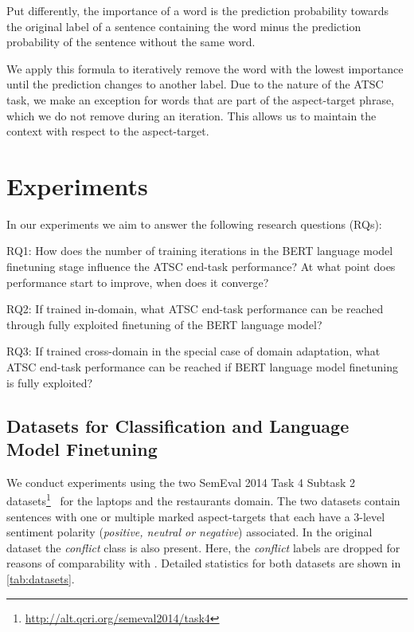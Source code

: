 \documentclass[11pt,a4paper]{article}
\newcommand{\rood}[1]{}
\begin{document}
Put differently, the importance of a word is the prediction probability towards the original label of a sentence containing the word minus the prediction probability of the sentence without the same word.

We apply this formula to iteratively remove the word with the lowest importance until the prediction changes to another label. Due to the nature of the ATSC task, we make an exception for words that are part of the aspect-target phrase, which we do not remove during an iteration. This allows us to maintain the context with respect to the aspect-target.

\section{Experiments}
In our experiments we aim to answer the following research questions (RQs):

RQ1: How does the number of training iterations in the BERT language model finetuning stage influence the ATSC end-task performance? At what point does performance start to improve, when does it converge?

RQ2: If trained in-domain, what ATSC end-task performance can be reached through fully exploited finetuning of the BERT language model?

RQ3: If trained cross-domain in the special case of domain adaptation, what ATSC end-task performance can be reached if BERT language model finetuning is fully exploited?

\subsection{Datasets for Classification and Language Model Finetuning}
\rood{Outcome: Readers understand how we make use/preprocess and so on of SemEval 2014 Datasets and the corpora for LM finetuning}

We conduct experiments using the two SemEval 2014 Task 4 Subtask 2
datasets\footnote{\url{http://alt.qcri.org/semeval2014/task4}}~\cite{Pontiki2014}
for the laptops and the restaurants domain. The two datasets contain
sentences with one or multiple marked aspect-targets that each have a 3-level sentiment polarity (\textit{positive, neutral
  or negative}) associated. In the original dataset the
\textit{conflict} class is also present. Here, the \textit{conflict} labels are dropped for reasons of comparability with \citet{Xu2019}. Detailed statistics for both datasets are shown in \autoref{tab:datasets}.
\end{document}
